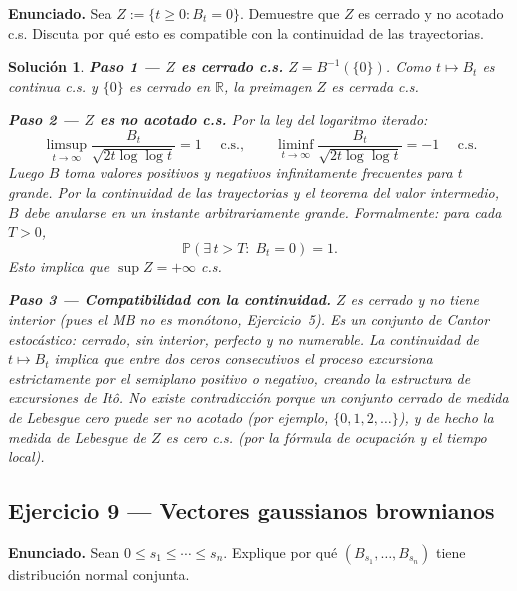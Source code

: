 \documentclass[12pt,letterpaper]{article}
\theoremstyle{ejercicio}
\theoremstyle{solucion}
\newtheorem*{solucion}{Solución}
\newcommand{\R}{\mathbb{R}}
\newcommand{\as}{\text{ c.s.}}
\renewcommand{\P}{\mathbb{P}}
\begin{document}
\begin{recuadro}
\textbf{Enunciado.} Sea $Z:=\{t\ge 0:B_t=0\}$. Demuestre que $Z$ es cerrado y no
acotado c.s. Discuta por qué esto es compatible con la continuidad de las trayectorias.
\end{recuadro}

\begin{solucion}

\textbf{Paso 1 — $Z$ es cerrado c.s.}
$Z = B^{-1}(\{0\})$. Como $t\mapsto B_t$ es continua c.s. y $\{0\}$ es cerrado en $\R$,
la preimagen $Z$ es cerrada c.s.

\textbf{Paso 2 — $Z$ es no acotado c.s.}
Por la ley del logaritmo iterado:
\[
  \limsup_{t\to\infty}\frac{B_t}{\sqrt{2t\log\log t}} = 1\quad\as,
  \qquad
  \liminf_{t\to\infty}\frac{B_t}{\sqrt{2t\log\log t}} = -1\quad\as
\]
Luego $B$ toma valores positivos y negativos infinitamente frecuentes para $t$ grande.
Por la continuidad de las trayectorias y el teorema del valor intermedio, $B$ debe
anularse en un instante arbitrariamente grande. Formalmente: para cada $T>0$,
\[
  \P\!\left(\exists\,t>T:\;B_t=0\right)=1.
\]
Esto implica que $\sup Z=+\infty$ c.s.

\textbf{Paso 3 — Compatibilidad con la continuidad.}
$Z$ es cerrado y no tiene interior (pues el MB no es monótono, Ejercicio~5).
Es un conjunto de Cantor estocástico: cerrado, sin interior, perfecto y no numerable.
La continuidad de $t\mapsto B_t$ implica que entre dos ceros consecutivos el proceso
excursiona estrictamente por el semiplano positivo o negativo, creando la estructura
de excursiones de Itô. No existe contradicción porque un conjunto cerrado de medida
de Lebesgue cero puede ser no acotado (por ejemplo, $\{0,1,2,\dots\}$), y de hecho
la medida de Lebesgue de $Z$ es cero c.s. (por la fórmula de ocupación y el tiempo local).
\end{solucion}

\subsection*{Ejercicio 9 — Vectores gaussianos brownianos}

\begin{recuadro}
\textbf{Enunciado.} Sean $0\le s_1\le\cdots\le s_n$. Explique por qué
$(B_{s_1},\dots,B_{s_n})$ tiene distribución normal conjunta.
\end{recuadro}
\end{document}
